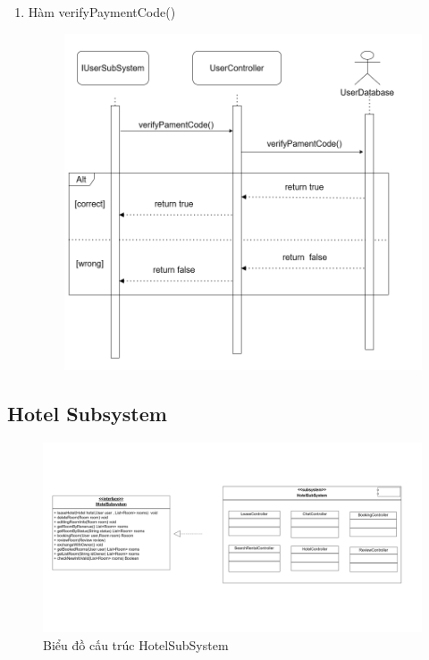 \begin{enumerate}
\begin{figure}[H]
        \end{figure}
        \item Hàm verifyPaymentCode()
        \begin{figure}[H]
        \centering
        \includegraphics[width=0.7\linewidth]{img3.5/user/verifyPaymentCode.png}
        \end{figure}
    \end{enumerate}

\subsection{Hotel Subsystem}
\begin{figure}[H]
    \centering
    \includegraphics[width=\textwidth]{img3.5/hotel/hotelsubsystem1.drawio (1).png} 
    \caption{Biểu đồ cấu trúc HotelSubSystem}
\end{figure}

